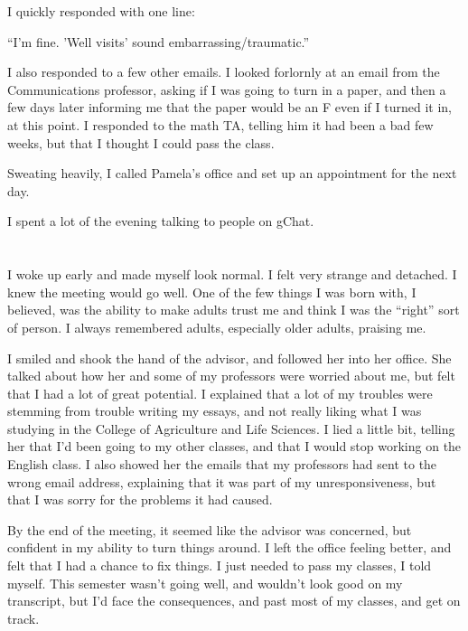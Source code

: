 I quickly responded with one line:

``I'm fine.  'Well visits' sound embarrassing/traumatic.'' 

I also responded to a few other emails.  I looked forlornly at an email from the
Communications professor, asking if I was going to turn in a paper, and then
a few days later informing me that the paper would be an F even if I turned it
in, at this point.  I responded to the math TA, telling him it had been a bad
few weeks, but that I thought I could pass the class.

Sweating heavily, I called Pamela's office and set up an appointment for the
next day. 

I spent a lot of the evening talking to people on gChat.

\section{}

I woke up early and made myself look normal.  I felt very strange and detached.
I knew the meeting would go well.  One of the few things I was born with, I
believed, was the ability to make adults trust me and think I was the ``right''
sort of person.  I always remembered adults, especially older adults, praising
me.

I smiled and shook the hand of the advisor, and followed her into her office.
She talked about how her and some of my professors were worried about me, but
felt that I had a lot of great potential.  I explained that a lot of my troubles
were stemming from trouble writing my essays, and not really liking what I was
studying in the College of Agriculture and Life Sciences.  I lied a little bit,
telling her that I'd been going to my other classes, and that I would stop
working on the English class.  I also showed her the emails that my professors
had sent to the wrong email address, explaining that it was part of my
unresponsiveness, but that I was sorry for the problems it had caused.

By the end of the meeting, it seemed like the advisor was concerned, but
confident in my ability to turn things around.  I left the office feeling
better, and felt that I had a chance to fix things.  I just needed to pass my
classes, I told myself.  This semester wasn't going well, and wouldn't look good
on my transcript, but I'd face the consequences, and past most of my classes,
and get on track.

\section{}

